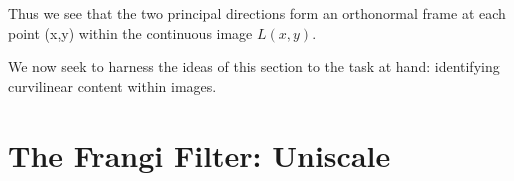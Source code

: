   Thus we see that the two principal directions form an orthonormal frame at each point (x,y) within the continuous image $L(x,y)$.
  
%  
%     	
  
	We now seek to harness the ideas of this section to the task at hand: identifying curvilinear content within images.

\section{The Frangi Filter: Uniscale} \label{sec:frangi}

